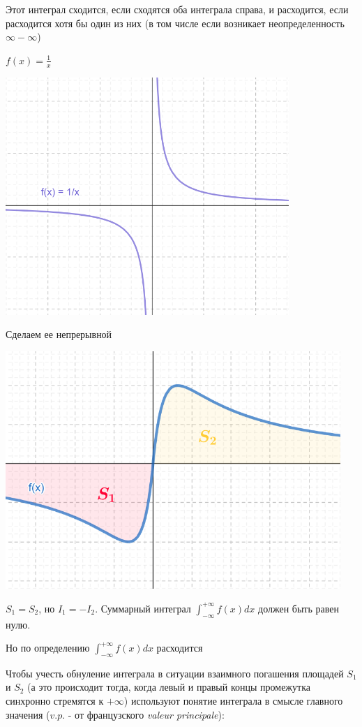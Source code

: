 \documentclass[12pt]{article}
\begin{document}
    \Nota Этот интеграл сходится, если сходятся оба интеграла справа, и расходится, если расходится хотя бы один из них
    (в том числе если возникает неопределенность $\infty - \infty$)

    \Ex $f(x) = \frac{1}{x}$

    \includegraphics[height=90mm]{images/calculus_2024_02_21_2}

    Сделаем ее непрерывной

    \includegraphics[height=90mm]{images/calculus_2024_02_21_3}

    $S_1 = S_2$, но $I_1 = -I_2$. Суммарный интеграл $\displaystyle \int^{+\infty}_{-\infty} f(x) dx$ должен быть равен нулю.

    Но по определению $\displaystyle \int^{+\infty}_{-\infty} f(x) dx$ расходится

    Чтобы учесть обнуление интеграла в ситуации взаимного погашения площадей $S_1$ и $S_2$
    (а это происходит тогда, когда левый и правый концы промежутка синхронно стремятся к $+\infty$)
    используют понятие интеграла в смысле главного значения ($v.p.$ - от французского \textit{valeur principale}):
\end{document}
